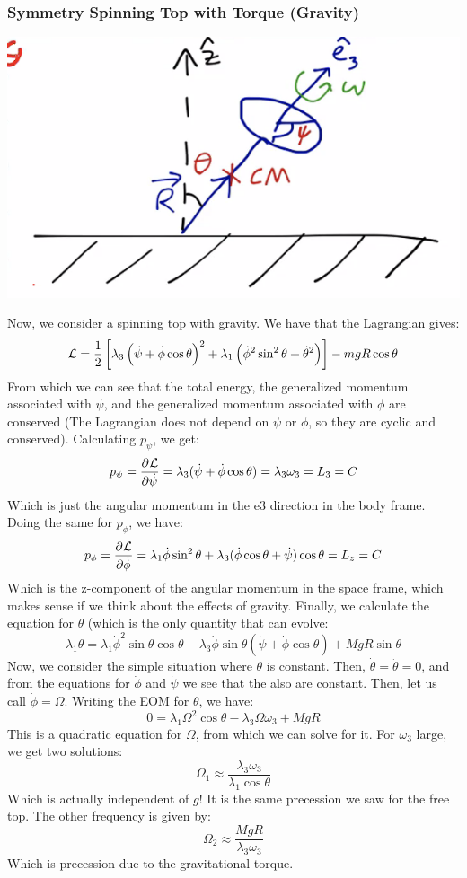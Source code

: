 \subsubsection{Symmetry Spinning Top with Torque (Gravity)}
\begin{center}
    \includegraphics[scale=0.5]{Lecture-21/l21-img2.png}
\end{center}
Now, we consider a spinning top with gravity. We have that the Lagrangian gives:
\[\mathcal{L} = \frac{1}{2}\left[\lambda_3\left(\dot{\psi} + \dot{\phi}\cos\theta\right)^2 + \lambda_1\left(\dot{\phi}^2\sin^2\theta + \dot{\theta}^2\right)\right] - mgR\cos\theta\]
From which we can see that the total energy, the generalized momentum associated with $\psi$, and the generalized momentum associated with $\phi$ are conserved (The Lagrangian does not depend on $\psi$ or $\phi$, so they are cyclic and conserved). Calculating $p_\psi$, we get:
\[p_\psi = \dpd{\LL}{\dot{\psi}} = \lambda_3(\dot{\psi} + \dot{\phi}\cos\theta) = \lambda_3\omega_3 = L_3 = C\]
Which is just the angular momentum in the e3 direction in the body frame. Doing the same for $p_\phi$, we have:
\[p_{\phi} = \dpd{\LL}{\dot{\phi}} = \lambda_1\dot{\phi}\sin^2\theta + \lambda_3(\dot{\phi}\cos\theta + \dot{\psi})\cos\theta = L_z = C\]
Which is the z-component of the angular momentum in the space frame, which makes sense if we think about the effects of gravity. Finally, we calculate the equation for $\theta$ (which is the only quantity that can evolve:
\[\lambda_1\ddot{\theta} = \lambda_1\dot{\phi}^2\sin\theta\cos\theta - \lambda_3\dot{\phi}\sin\theta(\dot{\psi} + \dot{\phi}\cos\theta) + MgR\sin\theta\]
Now, we consider the simple situation where $\theta$ is constant. Then, $\dot{\theta} = \ddot{\theta} = 0$, and from the equations for $\dot{\phi}$ and $\dot{\psi}$ we see that the also are constant. Then, let us call $\dot{\phi} = \Omega$. Writing the EOM for $\theta$, we have:
\[0 = \lambda_1\Omega^2\cos\theta - \lambda_3\Omega\omega_3 + MgR\]
This is a quadratic equation for $\Omega$, from which we can solve for it. For $\omega_3$ large, we get two solutions:
\[\Omega_1 \approx \frac{\lambda_3\omega_3}{\lambda_1\cos\theta}\]
Which is actually independent of $g$! It is the same precession we saw for the free top. The other frequency is given by:
\[\Omega_2 \approx \frac{MgR}{\lambda_3\omega_3}\]
Which is precession due to the gravitational torque. 